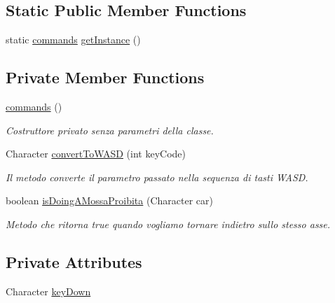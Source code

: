 \subsection*{Static Public Member Functions}
\begin{DoxyCompactItemize}
\item 
static \mbox{\hyperlink{class_snake_1_1game_1_1utility_1_1commands}{commands}} \mbox{\hyperlink{class_snake_1_1game_1_1utility_1_1commands_a388ff71d8b8e9c6f6a68839aa5575acc}{get\+Instance}} ()
\end{DoxyCompactItemize}
\subsection*{Private Member Functions}
\begin{DoxyCompactItemize}
\item 
\mbox{\hyperlink{class_snake_1_1game_1_1utility_1_1commands_af0afefa0d79d09344a638cf6c532aa39}{commands}} ()
\begin{DoxyCompactList}\small\item\em Costruttore privato senza parametri della classe. \end{DoxyCompactList}\item 
Character \mbox{\hyperlink{class_snake_1_1game_1_1utility_1_1commands_a66de6f4fd0fc79b7d17dc3196aa5fe7e}{convert\+To\+W\+A\+SD}} (int key\+Code)
\begin{DoxyCompactList}\small\item\em Il metodo converte il parametro passato nella sequenza di tasti W\+A\+SD. \end{DoxyCompactList}\item 
boolean \mbox{\hyperlink{class_snake_1_1game_1_1utility_1_1commands_a5852b0c61e12c9a0dff32d89faf56a0f}{is\+Doing\+A\+Mossa\+Proibita}} (Character car)
\begin{DoxyCompactList}\small\item\em Metodo che ritorna true quando vogliamo tornare indietro sullo stesso asse. \end{DoxyCompactList}\end{DoxyCompactItemize}
\subsection*{Private Attributes}
\begin{DoxyCompactItemize}
\item 
Character \mbox{\hyperlink{class_snake_1_1game_1_1utility_1_1commands_a09bac1b4079089c0f6a6eff874a820b8}{key\+Down}}
\end{DoxyCompactItemize}
